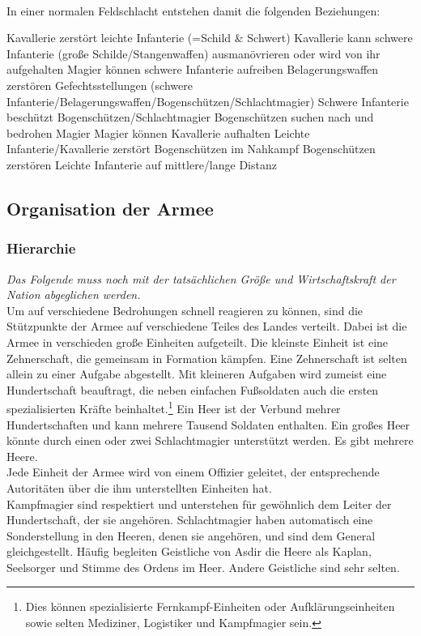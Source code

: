 \paragraph{}In einer normalen Feldschlacht entstehen damit die folgenden Beziehungen:
\begin{outline}
	\1 Kavallerie zerstört leichte Infanterie (=Schild \& Schwert)
	\1 Kavallerie kann schwere Infanterie (große Schilde/Stangenwaffen) ausmanövrieren oder wird von ihr aufgehalten
	\1 Magier können schwere Infanterie aufreiben
	\1 Belagerungswaffen zerstören Gefechtsstellungen (schwere Infanterie/Belagerungswaffen/Bogenschützen/Schlachtmagier)
	\1 Schwere Infanterie beschützt Bogenschützen/Schlachtmagier
	\1 Bogenschützen suchen nach und bedrohen Magier
	\1 Magier können Kavallerie aufhalten
	\1 Leichte Infanterie/Kavallerie zerstört Bogenschützen im Nahkampf
	\1 Bogenschützen zerstören Leichte Infanterie auf mittlere/lange Distanz 
\end{outline}

\subsection{Organisation der Armee}
\subsubsection{Hierarchie}
\emph{Das Folgende muss noch mit der tatsächlichen Größe und Wirtschaftskraft der Nation abgeglichen werden.}\\
Um auf verschiedene Bedrohungen schnell reagieren zu können, sind die Stützpunkte der Armee auf verschiedene Teiles des Landes verteilt. 
Dabei ist die Armee in verschieden große Einheiten aufgeteilt. Die kleinste Einheit ist eine Zehnerschaft, die gemeinsam in Formation kämpfen. 
Eine Zehnerschaft ist selten allein zu einer Aufgabe abgestellt. Mit kleineren Aufgaben wird zumeist eine Hundertschaft beauftragt, die neben einfachen 
Fußsoldaten auch die ersten spezialisierten Kräfte beinhaltet.\footnote{Dies können spezialisierte Fernkampf-Einheiten oder Aufklärungseinheiten sowie selten Mediziner, Logistiker und Kampfmagier sein.} 
Ein Heer ist der Verbund mehrer Hundertschaften und kann mehrere Tausend Soldaten enthalten. Ein großes Heer könnte durch einen oder zwei Schlachtmagier unterstützt werden.
 Es gibt mehrere Heere.\\
Jede Einheit der Armee wird von einem Offizier geleitet, der entsprechende Autoritäten über die ihm unterstellten Einheiten hat.\\
Kampfmagier sind respektiert und unterstehen für gewöhnlich dem Leiter der Hundertschaft, der sie angehören. 
Schlachtmagier haben automatisch eine Sonderstellung in den Heeren, denen sie angehören, und sind dem General gleichgestellt. 
Häufig begleiten Geistliche von Asdir die Heere als Kaplan, Seelsorger und Stimme des Ordens im Heer. Andere Geistliche sind sehr selten.
